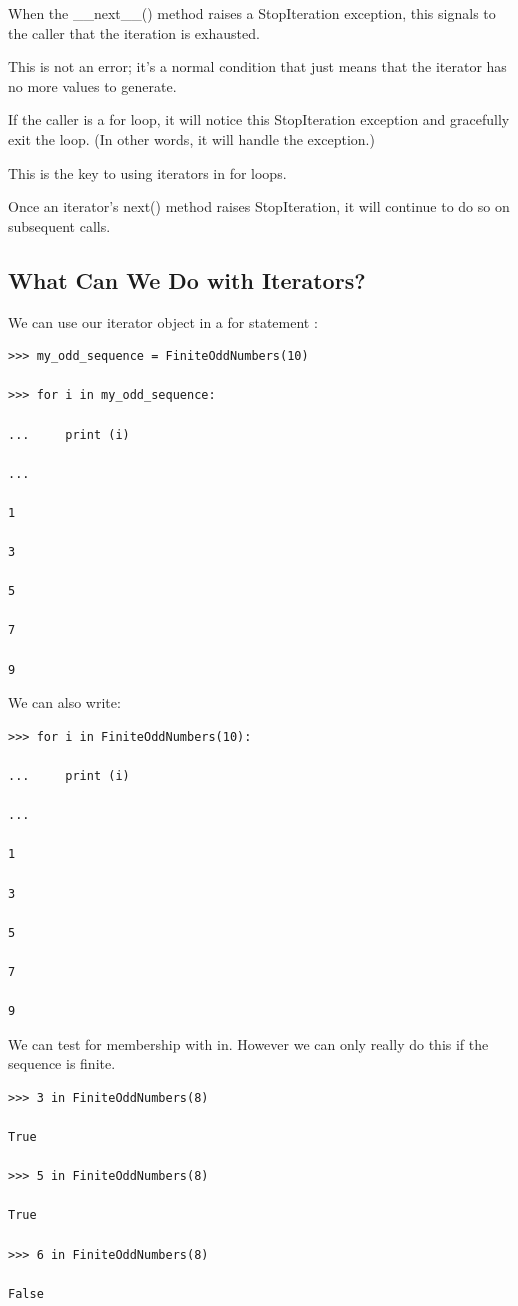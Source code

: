 \documentclass{article}
\begin{document}
When the {\_}{\_}next{\_}{\_}() method raises a StopIteration exception, this signals to the caller that the iteration is exhausted.

This is not an error; it’s a normal condition that just means that the iterator has no more values to generate. 

If the caller is a for loop, it will notice this StopIteration exception and gracefully exit the loop. (In other words, it will handle the exception.) 

This is the key to using iterators in for loops.

Once an iterator’s next() method raises StopIteration, it will continue to do so on subsequent calls.

\subsection{What Can We Do with Iterators?}

We can use our iterator object in a for statement :

\begin{lstlisting}
>>> my_odd_sequence = FiniteOddNumbers(10)

>>> for i in my_odd_sequence:

...     print (i)

...     

1

3

5

7

9
\end{lstlisting}

We can also write:

\begin{lstlisting}
>>> for i in FiniteOddNumbers(10):

...     print (i)

...     

1

3

5

7

9
\end{lstlisting}

We can test  for membership with in.  However we can only really do this if the sequence is finite.

\begin{lstlisting}
>>> 3 in FiniteOddNumbers(8)

True

>>> 5 in FiniteOddNumbers(8)

True

>>> 6 in FiniteOddNumbers(8)

False
\end{lstlisting}
\end{document}
